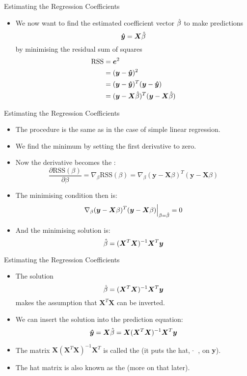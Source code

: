 \documentclass[mathserif, aspectratio=169]{beamer}
\begin{document}
\begin{frame}{Estimating the Regression Coefficients}
	\begin{itemize}
		\item We now want to find the estimated coefficient vector $\hat{\beta}$ to make predictions
			\[ \bm{\hat{y}} = \bm{X}\hat{\beta} \]
			by minimising the residual sum of squares
			\begin{align*}
				\text{RSS} &= \bm{e}^2\\
				{} &= (\bm{y} - \bm{\hat{y}})^2\\
				{} &= (\bm{y} - \bm{\hat{y}})^T(\bm{y} - \bm{\hat{y}})\\
				{} &= (\bm{y} - \bm{X}\hat{\beta})^T(\bm{y} - \bm{X}\hat{\beta})\\
			\end{align*}
	\end{itemize}
\end{frame}

\begin{frame}{Estimating the Regression Coefficients}
	\begin{itemize}
		\item The procedure is the same as in the case of simple linear regression.
		\item We find the minimum by setting the first derivative to zero.
		\item Now the derivative becomes the :
			\[
				\frac{\partial\text{RSS}(\beta)}{\partial\beta}
				= \nabla_{\beta} \text{RSS}(\beta)
				= \nabla_{\beta} (\bm{y} - \bm{X}\beta)^T(\bm{y} - \bm{X}\beta)
			\]
		\item The minimising condition then is:
			\[
				\nabla_{\beta} (\bm{y} - \bm{X}\beta)^T(\bm{y} - \bm{X}\beta) \Bigr\rvert_{\beta = \hat{\beta}} = 0
			\]
		\item And the minimising solution is:
			\[
				\hat{\beta} = (\bm{X}^T\bm{X})^{-1}\bm{X}^T\bm{y}
			\]
	\end{itemize}
\end{frame}

\begin{frame}{Estimating the Regression Coefficients}
	\begin{itemize}
		\item The solution
			\[
				\hat{\beta} = (\bm{X}^T\bm{X})^{-1}\bm{X}^T\bm{y}
			\]
			makes the assumption that $\bm{X}^T\bm{X}$ can be inverted.
		\item We can insert the solution into the prediction equation:
			\[
				\bm{\hat{y}} = \bm{X}\hat{\beta} = \bm{X} (\bm{X}^T\bm{X})^{-1}\bm{X}^T\bm{y}
			\]
		\item The matrix $\bm{X} (\bm{X}^T\bm{X})^{-1}\bm{X}^T$ is called the 
			(it puts the hat, $\;\bm{\hat{}}\;\;$, on $\bm{y}$).
		\item The hat matrix is also known as the  (more on that later).
	\end{itemize}
\end{frame}
\end{document}
